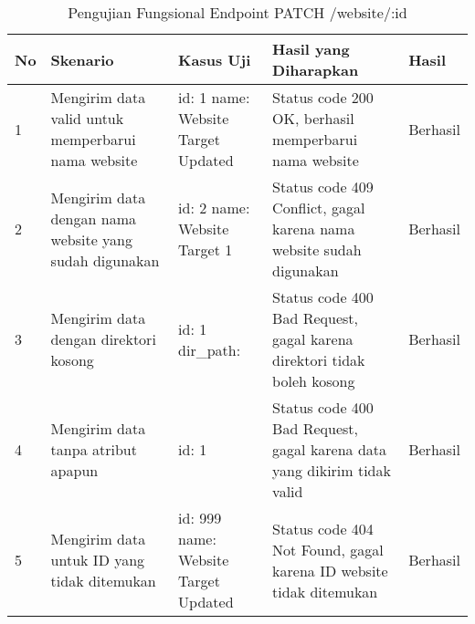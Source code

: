 \begin{table}[H]
    \centering
    \begin{tabular}{|p{0.5cm}|p{3cm}|p{5cm}|p{5cm}|p{1.5cm}|}
        \hline
        \rowcolor[HTML]{DAE8FC} 
        \textbf{No} & \textbf{Skenario} & \textbf{Kasus Uji} & \textbf{Hasil yang Diharapkan} & \textbf{Hasil} \\ \hline
        1 & Mengirim data valid untuk memperbarui nama website & 
        id: 1 \newline 
        name: Website Target Updated & 
        Status code 200 OK, berhasil memperbarui nama website & 
        Berhasil \\ \hline
        2 & Mengirim data dengan nama website yang sudah digunakan & 
        id: 2 \newline 
        name: Website Target 1 & 
        Status code 409 Conflict, gagal karena nama website sudah digunakan & 
        Berhasil \\ \hline
        3 & Mengirim data dengan direktori kosong & 
        id: 1 \newline 
        dir\_path: & 
        Status code 400 Bad Request, gagal karena direktori tidak boleh kosong & 
        Berhasil \\ \hline
        4 & Mengirim data tanpa atribut apapun & 
        id: 1 & 
        Status code 400 Bad Request, gagal karena data yang dikirim tidak valid & 
        Berhasil \\ \hline
        5 & Mengirim data untuk ID yang tidak ditemukan & 
        id: 999 \newline 
        name: Website Target Updated & 
        Status code 404 Not Found, gagal karena ID website tidak ditemukan & 
        Berhasil \\ \hline
    \end{tabular}
    \caption{Pengujian Fungsional Endpoint PATCH /website/:id}
    \label{tab:website_update_testing}
\end{table}
